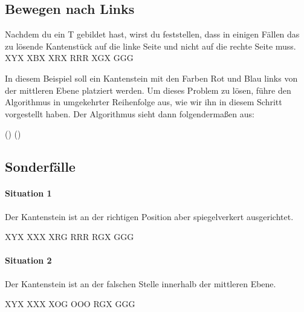 \subsection{Bewegen nach Links}
Nachdem du ein T gebildet hast, wirst du feststellen, dass in einigen Fällen
das zu lösende Kantenstück auf die linke Seite und nicht auf die rechte Seite muss.\\[1em]
\RubikCubeGreyAll%
            {X}{Y}{X}
            {X}{B}{X}%
               {X}{R}{X}
	       {R}{R}{R}%
	       {X}{G}{X}
	       {G}{G}{G}%
\parbox{0.7\linewidth}{
  In diesem Beispiel soll ein Kantenstein mit den Farben Rot und Blau links von
  der mittleren Ebene platziert werden. Um dieses Problem zu lösen, führe den
  Algorithmus in umgekehrter Reihenfolge aus, wie wir ihn in diesem Schritt
  vorgestellt haben. Der Algorithmus sieht dann folgendermaßen aus:
}
\begin{center}
	\sffamily\Large () ()
\end{center}

\subsection{Sonderfälle}

\parbox{0.7\linewidth}{
  \paragraph{Situation 1}
  Der Kantenstein ist an der richtigen Position aber spiegelverkert ausgerichtet.\\[1em]
}
\RubikCubeGreyAll%
            {X}{Y}{X}
            {X}{X}{X}%
               {X}{R}{G}
	       {R}{R}{R}%
	       {R}{G}{X}
	       {G}{G}{G}%
\\[1em]
\parbox{0.7\linewidth}{
  \paragraph{Situation 2}
  Der Kantenstein ist an der falschen Stelle innerhalb der mittleren Ebene.\\[1em]
}
\RubikCubeGreyAll%
            {X}{Y}{X}
            {X}{X}{X}%
               {X}{O}{G}
	       {O}{O}{O}%
	       {R}{G}{X}
	       {G}{G}{G}%
\\[1em]

